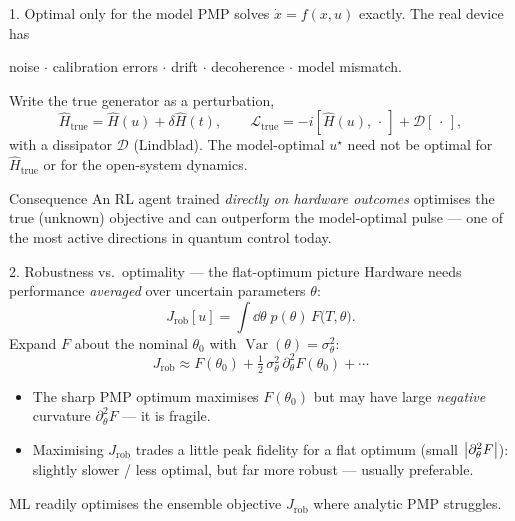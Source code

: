 \documentclass[10pt,aspectratio=169]{beamer}
\newcommand{\Hop}{\hat H}
\DeclareMathOperator{\Var}{Var}
\begin{document}
\begin{frame}{1. Optimal only for the model}
  PMP solves $\dot x = f(x,u)$ exactly. The real device has
  \begin{center}
    noise \;$\cdot$\; calibration errors \;$\cdot$\; drift \;$\cdot$\;
    decoherence \;$\cdot$\; model mismatch.
  \end{center}
  Write the true generator as a perturbation,
  \[
    \Hop_{\text{true}} = \Hop(u) + \delta\Hop(t),\qquad
    \mathcal{L}_{\text{true}} = -i[\Hop(u),\,\cdot\,] + \mathcal{D}[\,\cdot\,],
  \]
  with a dissipator $\mathcal{D}$ (Lindblad). The model-optimal $u^\star$ need not
  be optimal for $\Hop_{\text{true}}$ or for the open-system dynamics.
  \begin{exampleblock}{Consequence}
    An RL agent trained \emph{directly on hardware outcomes} optimises the true
    (unknown) objective and can outperform the model-optimal pulse --- one of
    the most active directions in quantum control today.
  \end{exampleblock}
\end{frame}

\begin{frame}{2. Robustness vs.\ optimality --- the flat-optimum picture}
  Hardware needs performance \emph{averaged} over uncertain parameters $\theta$:
  \begin{equation}
    J_{\text{rob}}[u] = \int \dd\theta\; p(\theta)\,F\big(T,\theta\big).
  \end{equation}
  Expand $F$ about the nominal $\theta_0$ with $\Var(\theta)=\sigma_\theta^2$:
  \begin{equation}
    J_{\text{rob}} \approx F(\theta_0)
      + \tfrac12\,\sigma_\theta^2\,\partial_\theta^2 F(\theta_0) + \cdots
  \end{equation}
  \begin{itemize}
    \item The sharp PMP optimum maximises $F(\theta_0)$ but may have large
          \emph{negative} curvature $\partial_\theta^2 F$ --- it is \alert{fragile}.
    \item Maximising $J_{\text{rob}}$ trades a little peak fidelity for a
          \alert{flat} optimum (small $\abs{\partial_\theta^2 F}$): slightly
          slower / less optimal, but far more robust --- usually preferable.
  \end{itemize}
  ML readily optimises the ensemble objective $J_{\text{rob}}$ where analytic PMP
  struggles.
\end{frame}
\end{document}
